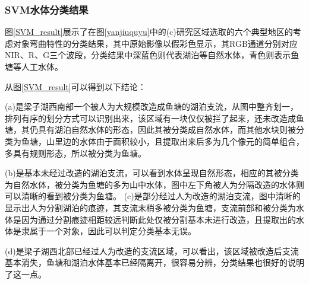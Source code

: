 \documentclass[supercite]{upcthesis}
\begin{document}
\subsubsection{SVM水体分类结果}
图\ref{SVM_result}展示了在图\ref{yanjiuquyu}中的(c)研究区域选取的六个典型地区的考虑对象弯曲特性的分类结果，其中原始影像以假彩色显示，其RGB通道分别对应NIR、R、G三个波段，分类结果中深蓝色则代表湖泊等自然水体，青色则表示鱼塘等人工水体。
\begin{figure*}[t]
	\centering
	\caption{SVM水体分类结果}
	\label{SVM_result}
\end{figure*}
从图\ref{SVM_result}可以得到以下结论：

(a)是梁子湖西南部一个被人为大规模改造成鱼塘的湖泊支流，从图中整齐划一，排列有序的划分方式可以识别出来，该区域有一块仅仅被拦了起来，还未改造成鱼塘，其仍具有湖泊自然水体的形态，因此其被分类成自然水体，而其他水块则被分类为鱼塘，山里边的水体由于面积较小，且提取出来后多为几个像元的简单组合，多具有规则形态，所以被分类为鱼塘。

(b)是基本未经过改造的湖泊支流，可以看到水体呈现自然形态，相应的其被分类为自然水体，被分类为鱼塘的多为山中水体，图中左下角被人为分隔改造的水体则可以清晰的看到被分类为鱼塘。
(c)是部分经过人为改造的湖泊支流，图中清晰的显示出人为分割湖泊的痕迹，其支流末梢多被分类为鱼塘，支流前部和被分类为水体是因为通过分割痕迹相距较远判断此处仅被分割基本未进行改造，且提取出的水体是隶属于一个对象，因此可以判定分类基本无误。

(d)是梁子湖西北部已经过人为改造的支流区域，可以看出，该区域被改造后支流基本消失，鱼塘和湖泊水体基本已经隔离开，很容易分辨，分类结果也很好的说明了这一点。
\end{document}
